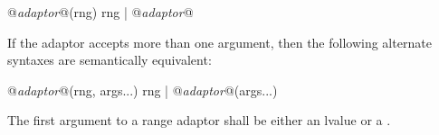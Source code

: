\begin{codeblock}
@\textit{adaptor}@(rng)
rng | @\textit{adaptor}@
\end{codeblock}

If the adaptor accepts more than one argument, then the following alternate syntaxes are
semantically equivalent:

\begin{codeblock}
@\textit{adaptor}@(rng, args...)
rng | @\textit{adaptor}@(args...)
\end{codeblock}

\pnum
The first argument to a range adaptor shall be either an lvalue  or a .

\pnum
\enterexample
{}
\exitexample
